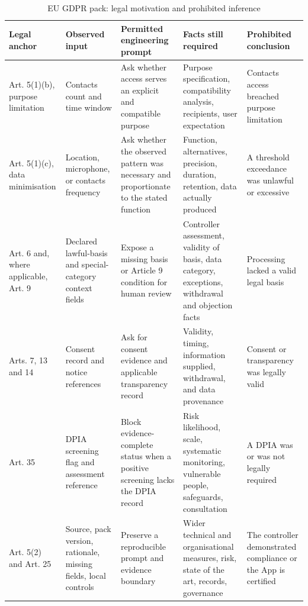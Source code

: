 \begin{table}[H]
\centering
\caption{EU GDPR pack: legal motivation and prohibited inference}
\label{tab:legal-traceability}
\scriptsize
\begin{tabular}{>{\raggedright\arraybackslash}p{}>{\raggedright\arraybackslash}p{}>{\raggedright\arraybackslash}p{}>{\raggedright\arraybackslash}p{}>{\raggedright\arraybackslash}p{}}
\toprule
Legal anchor & Observed input & Permitted engineering prompt & Facts still required & Prohibited conclusion \\
\midrule
Art. 5(1)(b), purpose limitation & Contacts count and time window & Ask whether access serves an explicit and compatible purpose & Purpose specification, compatibility analysis, recipients, user expectation & Contacts access breached purpose limitation \\
Art. 5(1)(c), data minimisation & Location, microphone, or contacts frequency & Ask whether the observed pattern was necessary and proportionate to the stated function & Function, alternatives, precision, duration, retention, data actually produced & A threshold exceedance was unlawful or excessive \\
Art. 6 and, where applicable, Art. 9 & Declared lawful-basis and special-category context fields & Expose a missing basis or Article 9 condition for human review & Controller assessment, validity of basis, data category, exceptions, withdrawal and objection facts & Processing lacked a valid legal basis \\
Arts. 7, 13 and 14 & Consent record and notice references & Ask for consent evidence and applicable transparency record & Validity, timing, information supplied, withdrawal, and data provenance & Consent or transparency was legally valid \\
Art. 35 & DPIA screening flag and assessment reference & Block evidence-complete status when a positive screening lacks the DPIA record & Risk likelihood, scale, systematic monitoring, vulnerable people, safeguards, consultation & A DPIA was or was not legally required \\
Art. 5(2) and Art. 25 & Source, pack version, rationale, missing fields, local controls & Preserve a reproducible prompt and evidence boundary & Wider technical and organisational measures, risk, state of the art, records, governance & The controller demonstrated compliance or the App is certified \\
\bottomrule
\end{tabular}
\end{table}

